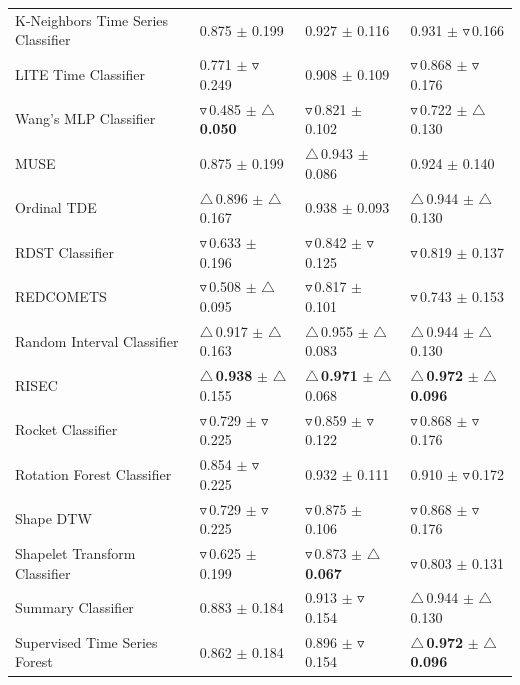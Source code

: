 \documentclass[final,3p,times,twocolumn]{elsarticle}
\begin{document}
\begin{table}[t!]
{\begin{tabular}{llll}
K-Neighbors Time Series Classifier & 0.875 $\pm$ 0.199 & 0.927 $\pm$ 0.116 & 0.931 $\pm$ $\triangledown$\,0.166 \\
LITE Time Classifier & 0.771 $\pm$ $\triangledown$\,0.249 & 0.908 $\pm$ 0.109 & $\triangledown$\,0.868 $\pm$ $\triangledown$\,0.176 \\
Wang's MLP Classifier & $\triangledown$\,0.485 $\pm$ \textbf{$\triangle$\,0.050} & $\triangledown$\,0.821 $\pm$ 0.102 & $\triangledown$\,0.722 $\pm$ $\triangle$\,0.130 \\
MUSE & 0.875 $\pm$ 0.199 & $\triangle$\,0.943 $\pm$ 0.086 & 0.924 $\pm$ 0.140 \\
Ordinal TDE & $\triangle$\,0.896 $\pm$ $\triangle$\,0.167 & 0.938 $\pm$ 0.093 & $\triangle$\,0.944 $\pm$ $\triangle$\,0.130 \\
RDST Classifier & $\triangledown$\,0.633 $\pm$ 0.196 & $\triangledown$\,0.842 $\pm$ $\triangledown$\,0.125 & $\triangledown$\,0.819 $\pm$ 0.137 \\
REDCOMETS & $\triangledown$\,0.508 $\pm$ $\triangle$\,0.095 & $\triangledown$\,0.817 $\pm$ 0.101 & $\triangledown$\,0.743 $\pm$ 0.153 \\
Random Interval Classifier & $\triangle$\,0.917 $\pm$ $\triangle$\,0.163 & $\triangle$\,0.955 $\pm$ $\triangle$\,0.083 & $\triangle$\,0.944 $\pm$ $\triangle$\,0.130 \\
RISEC & \textbf{$\triangle$\,0.938} $\pm$ $\triangle$\,0.155 & \textbf{$\triangle$\,0.971} $\pm$ $\triangle$\,0.068 & \textbf{$\triangle$\,0.972} $\pm$ \textbf{$\triangle$\,0.096} \\
Rocket Classifier & $\triangledown$\,0.729 $\pm$ $\triangledown$\,0.225 & $\triangledown$\,0.859 $\pm$ $\triangledown$\,0.122 & $\triangledown$\,0.868 $\pm$ $\triangledown$\,0.176 \\
Rotation Forest Classifier & 0.854 $\pm$ $\triangledown$\,0.225 & 0.932 $\pm$ 0.111 & 0.910 $\pm$ $\triangledown$\,0.172 \\
Shape DTW & $\triangledown$\,0.729 $\pm$ $\triangledown$\,0.225 & $\triangledown$\,0.875 $\pm$ 0.106 & $\triangledown$\,0.868 $\pm$ $\triangledown$\,0.176 \\
Shapelet Transform Classifier & $\triangledown$\,0.625 $\pm$ 0.199 & $\triangledown$\,0.873 $\pm$ \textbf{$\triangle$\,0.067} & $\triangledown$\,0.803 $\pm$ 0.131 \\
Summary Classifier & 0.883 $\pm$ 0.184 & 0.913 $\pm$ $\triangledown$\,0.154 & $\triangle$\,0.944 $\pm$ $\triangle$\,0.130 \\
Supervised Time Series Forest & 0.862 $\pm$ 0.184 & 0.896 $\pm$ $\triangledown$\,0.154 & \textbf{$\triangle$\,0.972} $\pm$ \textbf{$\triangle$\,0.096} \\

\end{tabular}}
\end{table}
\end{document}
